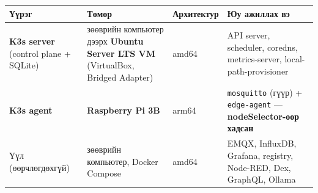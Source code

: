 \begingroup\scriptsize\begin{longtable}[]{@{}llll@{}}
\toprule
\begin{minipage}[b]{0.22\columnwidth}\raggedright
Үүрэг\strut
\end{minipage} & \begin{minipage}[b]{0.22\columnwidth}\raggedright
Төмөр\strut
\end{minipage} & \begin{minipage}[b]{0.22\columnwidth}\raggedright
Архитектур\strut
\end{minipage} & \begin{minipage}[b]{0.22\columnwidth}\raggedright
Юу ажиллах вэ\strut
\end{minipage}\tabularnewline
\midrule
\endhead
\begin{minipage}[t]{0.22\columnwidth}\raggedright
\textbf{K3s server} (control plane + SQLite)\strut
\end{minipage} & \begin{minipage}[t]{0.22\columnwidth}\raggedright
зөөврийн компьютер дээрх \textbf{Ubuntu Server LTS VM} (VirtualBox, Bridged Adapter)\strut
\end{minipage} & \begin{minipage}[t]{0.22\columnwidth}\raggedright
amd64\strut
\end{minipage} & \begin{minipage}[t]{0.22\columnwidth}\raggedright
API server, scheduler, coredns, metrics-server, local-path-provisioner\strut
\end{minipage}\tabularnewline
\begin{minipage}[t]{0.22\columnwidth}\raggedright
\textbf{K3s agent}\strut
\end{minipage} & \begin{minipage}[t]{0.22\columnwidth}\raggedright
\textbf{Raspberry Pi 3B}\strut
\end{minipage} & \begin{minipage}[t]{0.22\columnwidth}\raggedright
arm64\strut
\end{minipage} & \begin{minipage}[t]{0.22\columnwidth}\raggedright
\texttt{mosquitto} (гүүр) + \texttt{edge-agent} --- \textbf{nodeSelector-оор хадсан}\strut
\end{minipage}\tabularnewline
\begin{minipage}[t]{0.22\columnwidth}\raggedright
Үүл (өөрчлөгдөхгүй)\strut
\end{minipage} & \begin{minipage}[t]{0.22\columnwidth}\raggedright
зөөврийн компьютер, Docker Compose\strut
\end{minipage} & \begin{minipage}[t]{0.22\columnwidth}\raggedright
amd64\strut
\end{minipage} & \begin{minipage}[t]{0.22\columnwidth}\raggedright
EMQX, InfluxDB, Grafana, registry, Node-RED, Dex, GraphQL, Ollama\strut
\end{minipage}\tabularnewline
\bottomrule
\end{longtable}\endgroup

